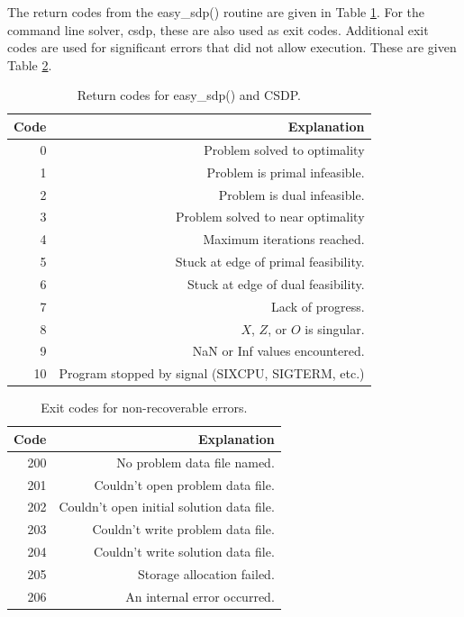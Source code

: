 \documentclass{article}
\begin{document}
The return codes from the easy\_sdp() routine are given in Table
\ref{retcodetable}.  For the command line solver, csdp, these are also
used as exit codes.  Additional exit codes are used for significant
errors that did not allow execution.  These are given Table
\ref{exitcodetable}.

\begin{table}
\begin{tabular}{|r|r|} \hline
  Code & Explanation \\  \hline
  0    & Problem solved to optimality \\ \hline
  1    & Problem is primal infeasible. \\  \hline
  2    & Problem is dual infeasible. \\  \hline
  3    & Problem solved to near optimality \\  \hline
  4    & Maximum iterations reached. \\  \hline
  5    & Stuck at edge of primal feasibility. \\ \hline
  6    & Stuck at edge of dual feasibility.  \\  \hline
  7    & Lack of progress. \\ \hline
  8    & $X$, $Z$, or $O$ is singular. \\ \hline
  9    & NaN or Inf values encountered. \\ \hline
  10   & Program stopped by signal (SIXCPU, SIGTERM, etc.) \\ \hline
\end{tabular}
\caption{Return codes for easy\_sdp() and CSDP.}
\label{retcodetable}
\end{table}

\begin{table}
\begin{tabular}{|r|r|} \hline
  Code   & Explanation \\  \hline
  200    & No problem data file named. \\   \hline
  201    & Couldn't open problem data file. \\  \hline
  202    & Couldn't open initial solution data file. \\   \hline
  203    & Couldn't write problem data file. \\   \hline
  204    & Couldn't write solution data file. \\  \hline
  205    & Storage allocation failed. \\  \hline
  206    & An internal error occurred. \\  \hline
\end{tabular}
\caption{Exit codes for non-recoverable errors.}
\label{exitcodetable}
\end{table}
\end{document}
